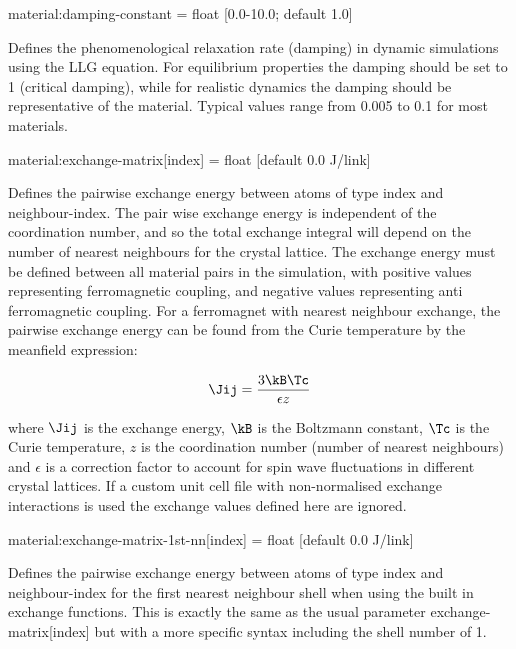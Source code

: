 {\zicf material:damping-constant = float [0.0-10.0; default 1.0]} Defines the phenomenological relaxation rate (damping) in dynamic simulations using the LLG equation. For equilibrium properties the damping should be set to 1 (critical damping), while for realistic dynamics the damping should be representative of the material. Typical values range from 0.005 to 0.1 for most materials.

{\zicf material:exchange-matrix[index] = float [default 0.0 J/link]} Defines the pairwise exchange energy between atoms of type index and neighbour-index. The pair wise exchange energy is independent of the coordination number, and so the total exchange integral will depend on the number of nearest neighbours for the crystal lattice. The exchange energy must be defined between all material pairs in the simulation, with positive values representing ferromagnetic coupling, and
negative values representing anti ferromagnetic coupling. For a ferromagnet with nearest neighbour exchange, the pairwise exchange energy can be found from the Curie temperature by the meanfield expression:

\begin{equation*}
\Jij = \frac{3\kB\Tc}{\epsilon z}
\end{equation*}

\noindent where $\Jij$ is the exchange energy, $\kB$ is the Boltzmann constant, $\Tc$ is the Curie temperature, $z$ is the coordination number (number of nearest neighbours) and $\epsilon$ is a correction factor to account for spin wave fluctuations in different crystal lattices. If a custom unit cell file with non-normalised exchange interactions is used the exchange values defined here are ignored.

{\zicf material:exchange-matrix-1st-nn[index] = float [default 0.0 J/link]} Defines the pairwise exchange energy between atoms of type index and neighbour-index for the first nearest neighbour shell when using the built in exchange functions. This is exactly the same as the usual parameter exchange-matrix[index] but with a more specific syntax including the shell number of 1.

